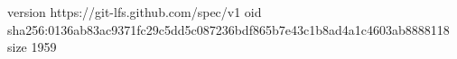 version https://git-lfs.github.com/spec/v1
oid sha256:0136ab83ac9371fc29c5dd5c087236bdf865b7e43c1b8ad4a1c4603ab8888118
size 1959
